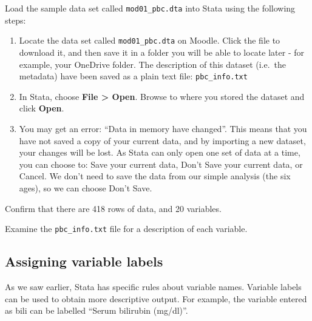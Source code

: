 \documentclass[
  a4paper,
]{memoir}
\providecommand{\tightlist}{%
  \setlength{\itemsep}{0pt}\setlength{\parskip}{0pt}}\usepackage{longtable,booktabs,array}
\begin{document}
\begin{tcolorbox}[enhanced jigsaw, title={TASK}, opacitybacktitle=0.6, colbacktitle=quarto-callout-note-color!10!white, titlerule=0mm, colframe=quarto-callout-note-color-frame, opacityback=0, left=2mm, breakable, bottomtitle=1mm, coltitle=black, bottomrule=.15mm, arc=.35mm, rightrule=.15mm, toptitle=1mm, colback=white, toprule=.15mm, leftrule=.75mm]

Load the sample data set called \texttt{mod01\_pbc.dta} into Stata using
the following steps:

\begin{enumerate}
\def\labelenumi{\arabic{enumi}.}
\tightlist
\item
  Locate the data set called \texttt{mod01\_pbc.dta} on Moodle. Click
  the file to download it, and then save it in a folder you will be able
  to locate later - for example, your OneDrive folder. The description
  of this dataset (i.e.~the metadata) have been saved as a plain text
  file: \texttt{pbc\_info.txt}
\item
  In Stata, choose \textbf{File \textgreater{} Open}. Browse to where
  you stored the dataset and click \textbf{Open}.
\item
  You may get an error: ``Data in memory have changed''. This means that
  you have not saved a copy of your current data, and by importing a new
  dataset, your changes will be lost. As Stata can only open one set of
  data at a time, you can choose to: Save your current data, Don't Save
  your current data, or Cancel. We don't need to save the data from our
  simple analysis (the six ages), so we can choose Don't Save.
\end{enumerate}

Confirm that there are 418 rows of data, and 20 variables.

Examine the \texttt{pbc\_info.txt} file for a description of each
variable.

\end{tcolorbox}

\hypertarget{assigning-variable-labels}{%
\subsection{Assigning variable labels}\label{assigning-variable-labels}}

As we saw earlier, Stata has specific rules about variable names.
Variable labels can be used to obtain more descriptive output. For
example, the variable entered as bili can be labelled ``Serum bilirubin
(mg/dl)''.
\end{document}
